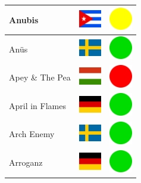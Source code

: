 \documentclass[12pt, a4paper, twoside]{report}
\begin{document}
\begin{center}
\begin{longtable}{|p{5cm}|p{2cm}|p{2cm}|}
Anubis & \includegraphics[width=1cm]{4x3/cu} & \includegraphics[width=1cm]{likes/m} \\ \hline
Anüs & \includegraphics[width=1cm]{4x3/se} & \includegraphics[width=1cm]{likes/y} \\ \hline
Apey \& The Pea & \includegraphics[width=1cm]{4x3/hu} & \includegraphics[width=1cm]{likes/n} \\ \hline
April in Flames & \includegraphics[width=1cm]{4x3/de} & \includegraphics[width=1cm]{likes/y} \\ \hline
Arch Enemy & \includegraphics[width=1cm]{4x3/se} & \includegraphics[width=1cm]{likes/y} \\ \hline
Arroganz & \includegraphics[width=1cm]{4x3/de} & \includegraphics[width=1cm]{likes/y} \\ \hline

\end{longtable}
\end{center}
\end{document}
